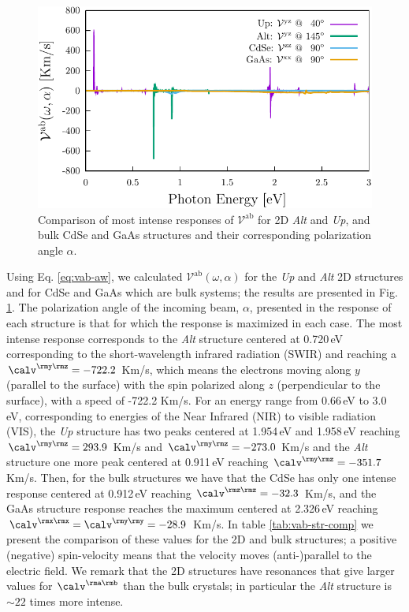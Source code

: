 \documentclass[prb,11pt,tightenlines,twocolumn,aps]{revtex4-1}
\begin{document}
\begin{figure}[t]
    \centering
    \includegraphics[width=\linewidth]{plots/vab-str-comp}
    
    \caption{Comparison of most intense responses of
    $\mathcal{V}^{\mathrm{ab}}$ for 2D \emph{Alt} and \emph{Up}, and bulk CdSe
    and GaAs structures and their corresponding polarization angle $\alpha$.}
    \label{fig:vab-str-comp}
\end{figure}

Using  Eq. \eqref{eq:vab-aw}, we calculated
$\mathcal{V}^{\mathrm{ab}}(\omega,\alpha)$ for the \emph{Up} and \emph{Alt} 2D
structures and for CdSe and GaAs which are bulk systems; the results are
presented in Fig. \ref{fig:vab-str-comp}. The polarization angle of the
incoming beam, $\alpha$, presented in the response of each structure is that
for which the response is maximized in each case.
% 
The most intense response corresponds to the \emph{Alt} structure centered at
0.720\,eV corresponding to the short-wavelength infrared radiation (SWIR) and
reaching a $\calv^{\rmy\rmz}=-722.2$ Km/s, which means the electrons moving
along $y$ (parallel to the surface) with the spin polarized along $z$
(perpendicular to the surface), with a speed of -722.2 Km/s.
% 
For an energy range from 0.66\,eV to 3.0\,eV, corresponding to energies of the
Near Infrared (NIR) to visible radiation (VIS), the \emph{Up} structure has two
peaks centered at 1.954\,eV and 1.958\,eV reaching $\calv^{\rmy\rmz}=293.9$
Km/s and $\calv^{\rmy\rmz}=-273.0$ Km/s and the \emph{Alt} structure one more
peak centered at 0.911\,eV reaching $\calv^{\rmy\rmz}=-351.7$ Km/s.
% 
Then, for the bulk structures we have that the CdSe has only one intense
response centered at 0.912\,eV reaching $\calv^{\rmz\rmz}=-32.3$ Km/s, and the
GaAs structure response reaches the maximum centered at 2.326\,eV reaching
$\calv^{\rmx\rmx}=\calv^{\rmy\rmy}=-28.9$ Km/s.
% 
In table \ref{tab:vab-str-comp} we present the comparison of these values for
the 2D and bulk structures; a positive (negative) spin-velocity means that the
velocity moves (anti-)parallel to the electric field.
% 
We remark that the 2D structures have resonances that give larger values for
$\calv^{\rma\rmb}$ than the bulk crystals; in particular the \emph{Alt}
structure is $\sim 22$ times more intense.
\end{document}
